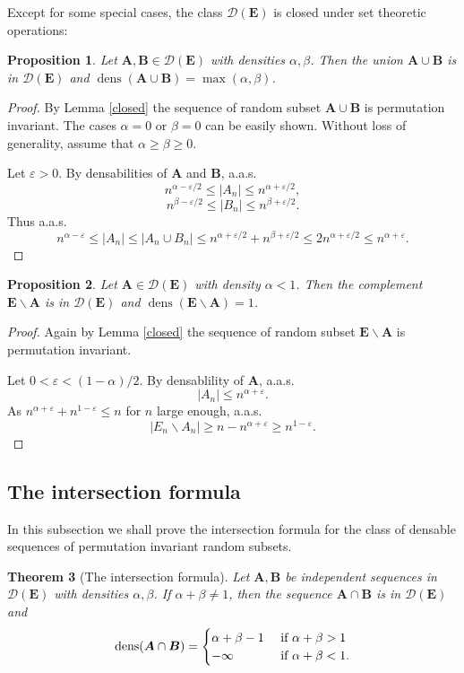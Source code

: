 \documentclass{article}
\DeclareMathOperator{\dens}{dens}
\newcommand{\bs}{\boldsymbol}
\newtheorem{thm}{Theorem}[section]
\newtheorem{prop}[thm]{Proposition}
\theoremstyle{remark}
\begin{document}
Except for some special cases, the class $\mathcal{D}(\bs E)$ is closed under set theoretic operations: 


\begin{prop} Let $\bs A, \bs B\in \mathcal{D}(\bs E)$ with densities $\alpha,\beta$. Then the union $\bs A\cup\bs B$ is in $\mathcal{D}(\bs E)$ and $\dens(\bs A\cup\bs B) = \max(\alpha,\beta)$.
\end{prop}
\begin{proof}
    By Lemma \ref{closed} the sequence of random subset $\bs A\cup\bs B$ is permutation invariant. The cases $\alpha=0$ or $\beta=0$ can be easily shown. Without loss of generality, assume that $\alpha \geq \beta \geq 0$.
    
    Let $\varepsilon>0$. By densabilities of $\bs A$ and $\bs B$, a.a.s.
    \[n^{\alpha-\varepsilon/2}\leq |A_n|\leq n^{\alpha+\varepsilon/2},\]
    \[n^{\beta-\varepsilon/2}\leq |B_n|\leq n^{\beta+\varepsilon/2}.\]
    Thus a.a.s.
    \[n^{\alpha-\varepsilon}\leq |A_n|\leq |A_n\cup B_n|\leq n^{\alpha+\varepsilon/2}+n^{\beta+\varepsilon/2}\leq 2n^{\alpha+\varepsilon/2}\leq n^{\alpha+\varepsilon}.\]
\end{proof}

\begin{prop}\label{complement}
    Let $\bs A\in \mathcal{D}(\bs E)$ with density $\alpha < 1$. Then the complement $\bs E\backslash \bs A$ is in $\mathcal{D}(\bs E)$ and $\dens(\bs E\backslash \bs A) = 1$.
\end{prop}
\begin{proof}
    Again by Lemma \ref{closed} the sequence of random subset $\bs E\backslash \bs A$ is permutation invariant.
    
    Let $0<\varepsilon<(1-\alpha)/2$. By densablility of $\bs A$, a.a.s.
    \[|A_n|\leq n^{\alpha+\varepsilon}.\]
    As $n^{\alpha+\varepsilon}+n^{1-\varepsilon}\leq n$ for $n$ large enough, a.a.s.
    \[|E_n\backslash A_n| \geq n-n^{\alpha+\varepsilon}\geq n^{1-\varepsilon}.\]
\end{proof}

\subsection{The intersection formula}

In this subsection we shall prove the intersection formula for the class of densable sequences of permutation invariant random subsets.

\begin{thm}[The intersection formula]\label{intersection} Let $\bs A, \bs B$ be independent sequences in $\mathcal{D}(\bs E)$ with densities $\alpha,\beta$. If $\alpha + \beta \neq 1$, then the sequence $\bs A\cap \bs B$ is in $\mathcal{D}(\bs E)$ and 
    \[\dens (\bs A\cap \bs B) = \begin{cases}
        \alpha + \beta - 1 & \textup{ if } \alpha + \beta > 1\\
        -\infty & \textup{ if } \alpha + \beta < 1.
        \end{cases}\]
\end{thm}
\end{document}
